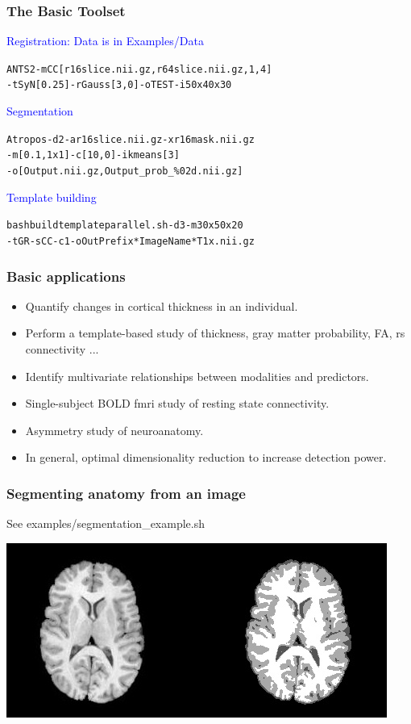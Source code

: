 \documentclass[18pt]{beamer}
\begin{document}
\begin{frame}
\frametitle{The Basic Toolset}
 \textcolor{blue}{Registration: Data is in Examples/Data} 
\begin{alltt}
ANTS 2 -m  CC[r16slice.nii.gz,r64slice.nii.gz,1,4] \newline
 -t SyN[0.25]  -r Gauss[3,0] -o TEST -i 50x40x30
\end{alltt}
\textcolor{blue}{Segmentation}
\begin{alltt}
Atropos -d 2 -a r16slice.nii.gz -x r16mask.nii.gz \newline
-m [0.1,1x1]   -c [10,0]  -i kmeans[3]\newline
-o [Output.nii.gz,Output\_prob\_\%02d.nii.gz]
\end{alltt}
\textcolor{blue}{Template building}
\begin{alltt}
 bash buildtemplateparallel.sh -d 3 -m 30x50x20 \newline 
-t GR  -s CC -c 1 -o OutPrefix  *ImageName*T1x.nii.gz
\end{alltt}
\end{frame}


\begin{frame}
\frametitle{Basic applications}
\begin{itemize}
\item Quantify changes in cortical thickness in an individual.
\pause 
\item Perform a template-based study of thickness, gray matter
  probability, FA, rs connectivity ... 
\pause
\item Identify multivariate relationships between modalities and
  predictors.
\pause
\item Single-subject BOLD fmri study of resting state connectivity.
\pause
\item Asymmetry study of neuroanatomy.
\pause
\item In general, optimal dimensionality reduction to increase detection power.  
\end{itemize}
\end{frame}



\begin{frame}
\frametitle{Segmenting anatomy from an image}
See  examples/segmentation\_example.sh

\begin{center}
\includegraphics[width=3.in]{../figures/r64sliceseg.jpg}
\end{center}
\end{frame}
\end{document}
